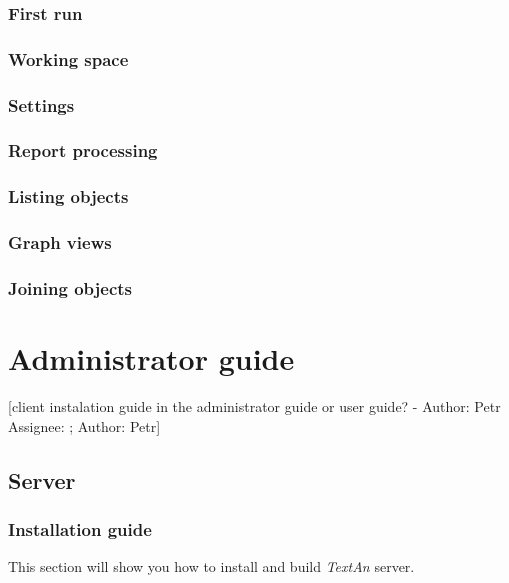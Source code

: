 \documentclass[12pt,a4paper]{report}
\makeatletter
\newcommand{\comment}[3][\@empty]{
  {\color{magenta}[#3 - }
  {\color{green}\ifx\@empty#1\relax Author: #2 \else Assignee: #1; Author: #2\fi}{\color{magenta}]}
}
\newcommand{\textan}{\emph{TextAn}}
\makeatother
\begin{document}
\subsection{First run}

\subsection{Working space}

\subsection{Settings}
\label{ssec:Settings}

\subsection{Report processing}

\subsection{Listing objects}

\subsection{Graph views}

\subsection{Joining objects}

\chapter{Administrator guide}

\comment{Petr}{client instalation guide in the administrator guide or user guide?}

\section{Server}

\subsection{Installation guide}


This section will show you how to install and build \textan{} server. 
\end{document}

